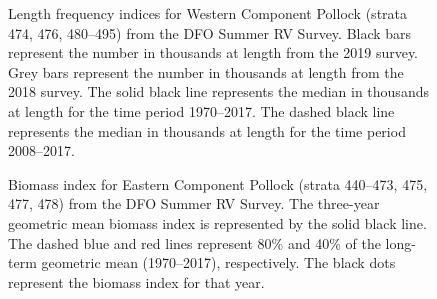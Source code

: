 \documentclass[11pt]{book}
\begin{document}
\begin{figure}[htb]

{\centering {} 

}

\caption{Length frequency indices for Western Component Pollock (strata 474, 476, 480--495) from the DFO Summer RV Survey. Black bars represent the number in thousands at length from the 2019 survey. Grey bars represent the number in thousands at length from the 2018 survey. The solid black line represents the median in thousands at length for the time period 1970--2017. The dashed black line represents the median in thousands at length for the time period 2008--2017.}\label{fig:33-fig-pollock-lengthfreqWestern}
\end{figure}

\begin{figure}[htb]

{\centering {} 

}

\caption{Biomass index for Eastern Component Pollock (strata 440--473, 475, 477, 478) from the DFO Summer RV Survey. The three-year geometric mean biomass index is represented by the solid black line. The dashed blue and red lines represent 80\% and 40\% of the long-term geometric mean (1970--2017), respectively. The black dots represent the biomass index for that year.}\label{fig:34-fig-pollock-biomassEastern}
\end{figure}
\end{document}
